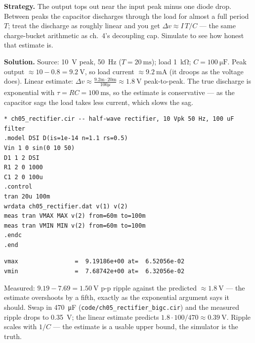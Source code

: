 \begin{example}\label{ex:rectifier}
\textbf{Strategy.} The output tops out near the input peak minus one
diode drop. Between peaks the capacitor discharges through the load for
almost a full period $T$; treat the discharge as roughly linear and you
get $\Delta v\approx I\,T/C$ --- the same charge-bucket arithmetic as
ch.~4's decoupling cap. Simulate to see how honest that estimate is.

\textbf{Solution.} Source: \qty{10}{\volt} peak, \qty{50}{\hertz}
($T=\qty{20}{\milli\second}$); load \qty{1}{\kilo\ohm}; $C=\qty{100}{\micro\farad}$.
Peak output $\approx 10-0.8=\qty{9.2}{\volt}$, so load current
$\approx\qty{9.2}{\milli\ampere}$ (it droops as the voltage does).
Linear estimate:
$\Delta v\approx \frac{9.2\text{m}\cdot20\text{m}}{100\mu}\approx\qty{1.8}{\volt}$
peak-to-peak. The true discharge is exponential with
$\tau=RC=\qty{100}{\milli\second}$, so the estimate is conservative ---
as the capacitor sags the load takes less current, which slows the sag.

\begin{lstlisting}[caption={\ttfamily code/ch05\_rectifier.cir --- one
diode, one capacitor, \qty{50}{\hertz} sine. The \texttt{meas} commands
quantify the ripple over the last two cycles.},label=lst:rectifier]
* ch05_rectifier.cir -- half-wave rectifier, 10 Vpk 50 Hz, 100 uF filter
.model DSI D(is=1e-14 n=1.1 rs=0.5)
Vin 1 0 sin(0 10 50)
D1 1 2 DSI
R1 2 0 1000
C1 2 0 100u
.control
tran 20u 100m
wrdata ch05_rectifier.dat v(1) v(2)
meas tran VMAX MAX v(2) from=60m to=100m
meas tran VMIN MIN v(2) from=60m to=100m
.endc
.end
\end{lstlisting}

\begin{lstlisting}[caption={Output, verbatim from ngspice-47.}]
vmax                =  9.19186e+00 at=  6.52056e-02
vmin                =  7.68742e+00 at=  6.32056e-02
\end{lstlisting}
\end{example}

Measured: $9.19-7.69=\qty{1.50}{\volt}$ p-p ripple against the predicted
$\approx\qty{1.8}{\volt}$ --- the estimate overshoots by a fifth, exactly
as the exponential argument says it should. Swap in \qty{470}{\micro\farad}
(\texttt{code/ch05\_rectifier\_bigc.cir}) and the measured ripple drops to
\qty{0.35}{\volt}; the linear estimate predicts $1.8\cdot100/470\approx
\qty{0.39}{\volt}$. Ripple scales with $1/C$ --- the estimate is a usable
upper bound, the simulator is the truth.

